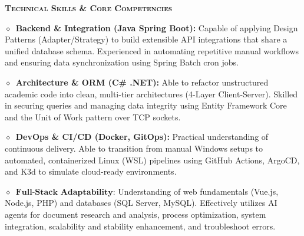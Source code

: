 \documentclass[11pt, a4paper]{article}
\newcommand{\is}{\par\vspace*{0.1ex}}
\newcommand{\smaller}[1]{{\small$\diamond$\ #1}}
\newcommand{\headright}[1]{\vspace*{0.4ex}\textsc{\Large\color{cvblue}\textbf{#1}}\par%
     \vspace*{-1.2ex}{\color{cvblue}\hrulefill}\par\vspace*{0.2ex}}
\begin{document}
\begin{minipage}[t]{0.59\textwidth}
\headright{Technical Skills \& Core Competencies}
\is
\smaller{\textbf{Backend \& Integration (Java Spring Boot):} Capable of applying Design Patterns (Adapter/Strategy) to build extensible API integrations that share a unified database schema. Experienced in automating repetitive manual workflows and ensuring data synchronization using Spring Batch cron jobs.}
\is
\smaller{\textbf{Architecture \& ORM (C\# .NET):} Able to refactor unstructured academic code into clean, multi-tier architectures (4-Layer Client-Server). Skilled in securing queries and managing data integrity using Entity Framework Core and the Unit of Work pattern over TCP sockets.}
\is
\smaller{\textbf{DevOps \& CI/CD (Docker, GitOps):} Practical understanding of continuous delivery. Able to transition from manual Windows setups to automated, containerized Linux (WSL) pipelines using GitHub Actions, ArgoCD, and K3d to simulate cloud-ready environments.}
\is
\smaller{\(\textbf{Full-Stack\ Adaptability:}\) Understanding of web fundamentals (Vue.js, Node.js, PHP) and databases (SQL Server, MySQL). Effectively utilizes AI agents for document research and analysis, process optimization, system integration, scalability and stability enhancement, and troubleshoot errors.}

\end{minipage}
\end{document}

